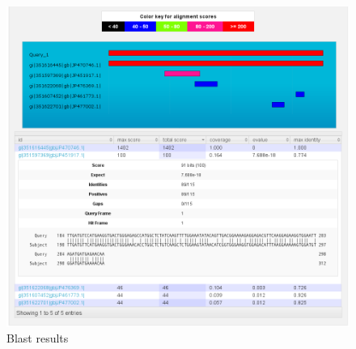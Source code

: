 \documentclass[english]{scrartcl}
\begin{document}
\begin{figure}
\begin{center}
  \includegraphics[width=\textwidth]{figures/blast_results_2.png}
  \caption{Blast results}
  \label{fig:blast_results_2}
\end{center}
\end{figure}

\newpage
\section*{}
\printbibliography
\end{document}
